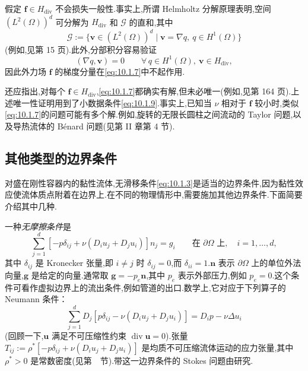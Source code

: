 假定 \(\boldsymbol{f}\in H_{\mathrm{div}}\) 不会损失一般性.事实上,所谓 Helmholtz 分解原理表明,空间 \((L^2(\Omega))^d\) 可分解为 \(H_{\mathrm{div}}\) 和 \(\mathcal G\) 的直和,其中
\begin{equation}\label{eq:10.1.16}
  \mathcal G:=\{\boldsymbol{v}\in(L^2(\Omega))^d\mid\boldsymbol{v}=\nabla q,\ q\in H^1(\Omega)\}
\end{equation}
(例如,见第 15 页).此外,分部积分容易验证
\begin{equation}\label{eq:10.1.17}
  (\nabla q,\boldsymbol{v})=0\qquad\forall\,q\in H^1(\Omega),\ \boldsymbol{v}\in H_{\mathrm{div}},
\end{equation}
因此外力场 \(\boldsymbol{f}\) 的梯度分量在\eqref{eq:10.1.7}中不起作用.

还应指出,对每个 \(\boldsymbol{f}\in H_{\mathrm{div}}\),\eqref{eq:10.1.7}都确实有解,但未必唯一(例如,见第 164 页).上述唯一性证明用到了小数据条件\eqref{eq:10.1.9}.事实上,已知当 \(\nu\) 相对于 \(\boldsymbol{f}\) 较小时,类似\eqref{eq:10.1.7}的问题可能有多个解.例如,旋转的无限长圆柱之间流动的 Taylor 问题,以及导热流体的 Bénard 问题(见第 II 章第 4 节).

\subsection{其他类型的边界条件}\label{sec:10.1.1}

对盛在刚性容器内的黏性流体,无滑移条件\eqref{eq:10.1.3}是适当的边界条件,因为黏性效应使流体质点附着在边界上.在不同的物理情形中,需要施加其他边界条件.下面简要介绍其中几种.

一种\emph{无摩擦条件}是
\begin{equation}\label{eq:10.1.18}
  \sum_{j=1}^d[-p\delta_{ij}+\nu(D_iu_j+D_ju_i)]n_j=g_i
     \qquad\text{在 }\partial\Omega\text{ 上},\quad i=1,\ldots,d,
\end{equation}
其中 \(\delta_{ij}\) 是 Kronecker 张量,即 \(i\ne j\) 时 \(\delta_{ij}=0\),而 \(\delta_{ii}=1\).\(\boldsymbol{n}\) 表示 \(\partial\Omega\) 上的单位外法向量,\(\boldsymbol{g}\) 是给定的向量.通常取 \(\boldsymbol{g}=-p_e\boldsymbol{n}\),其中 \(p_e\) 表示外部压力,例如 \(p_e=0\).这个条件可看作虚拟边界上的流出条件,例如管道的出口.数学上,它对应于下列算子的 Neumann 条件：
\begin{equation}\label{eq:10.1.19}
  \sum_{j=1}^dD_j[p\delta_{ij}-\nu(D_iu_j+D_ju_i)]
      =D_ip-\nu\Delta u_i
\end{equation}
(回顾一下,\(\boldsymbol{u}\) 满足不可压缩性约束 \(\operatorname{div}\boldsymbol{u}=0\)).张量 \(T_{ij}:=\rho^*[-p\delta_{ij}+\nu(D_iu_j+D_ju_i)]\) 是均质不可压缩流体运动的应力张量,其中 \(\rho^*>0\) 是常数密度(见第~~节).带这一边界条件的 Stokes 问题由研究.

